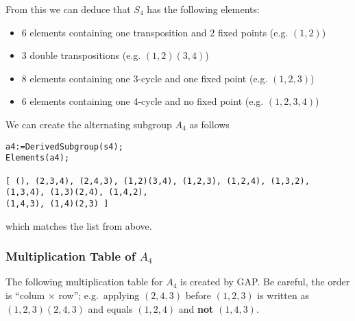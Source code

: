 From this we can deduce that \(S_4\) has the following elements:

\begin{itemize}

\item
  6 elements containing one transposition and 2 fixed points (e.g.
  \((1,2)\))
\item
  3 double transpositions (e.g. \((1,2)(3,4)\))
\item
  8 elements containing one 3-cycle and one fixed point (e.g.
  \((1,2,3)\))
\item
  6 elements containing one 4-cycle and no fixed point (e.g.
  \((1,2,3,4)\))
\end{itemize}

We can create the alternating subgroup \(A_4\) as follows

\begin{verbatim}
a4:=DerivedSubgroup(s4);
Elements(a4);

[ (), (2,3,4), (2,4,3), (1,2)(3,4), (1,2,3), (1,2,4), (1,3,2), (1,3,4), (1,3)(2,4), (1,4,2), 
(1,4,3), (1,4)(2,3) ]
\end{verbatim}

which matches the list from above.

\subsubsection{Multiplication Table of $A_4$}

The following multiplication table for \(A_4\) is created by GAP. Be
careful, the order is ``colum \(\times\) row''; e.g.~applying
\((2,4,3)\) before \((1,2,3)\) is written as \((1,2,3)(2,4,3)\) and
equals \((1,2,4)\) and \textbf{not} \((1,4,3)\).

